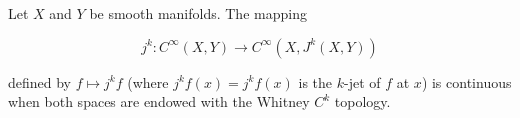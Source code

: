 Let $X$ and $Y$ be smooth manifolds. The mapping

$$j^k: C^\infty(X, Y) \to C^\infty(X, J^k(X, Y))$$

defined by $f \mapsto j^k f$ (where $j^k f(x) = j^k f(x)$ is the $k$-jet of $f$ at $x$) is continuous when both spaces are endowed with the Whitney $C^k$ topology.
